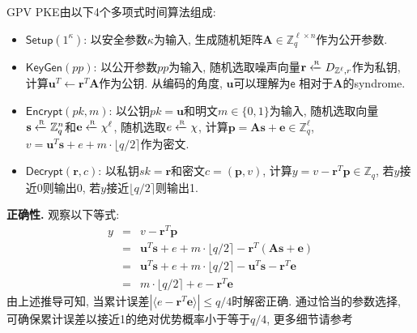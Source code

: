 \begin{trivlist}
\item GPV PKE由以下4个多项式时间算法组成: 
\begin{itemize}
\item $\mathsf{Setup}(1^\kappa)$: 以安全参数$\kappa$为输入, 生成随机矩阵$\mathbf{A} \in \mathbb{Z}_q^{\ell \times n}$作为公开参数. 

\item $\mathsf{KeyGen}(pp)$: 以公开参数$pp$为输入, 随机选取噪声向量$\mathbf{r} \xleftarrow{\textup{\tiny R}} D_{\mathbb{Z}^\ell, r}$作为私钥, 
    计算$\mathbf{u}^T \leftarrow \mathbf{r}^T\mathbf{A}$作为公钥. 从编码的角度, $\mathbf{u}$可以理解为$\mathsf{e}$
    相对于$\mathbf{A}$的syndrome. 

\item $\mathsf{Encrypt}(pk, m)$: 以公钥$pk = \mathbf{u}$和明文$m \in \{0,1\}$为输入, 
	随机选取向量$\mathbf{s} \xleftarrow{\textup{\tiny R}} \mathbb{Z}_q^n$和$\mathbf{e} \xleftarrow{\textup{\tiny R}} \chi^\ell$, 随机选取$e \xleftarrow{\textup{\tiny R}} \chi$, 
	计算$\mathbf{p} = \mathbf{A}\mathbf{s}+\mathbf{e} \in \mathbb{Z}_q^\ell$, 
	$v = \mathbf{u}^T \mathbf{s} + e + m \cdot \lfloor q/2 \rceil$作为密文. 

\item $\mathsf{Decrypt}(\mathbf{r}, c)$: 以私钥$sk = \mathbf{r}$和密文$c = (\mathbf{p}, v)$, 
    计算$y = v - \mathbf{r}^T\mathbf{p} \in \mathbb{Z}_q$, 若$y$接近0则输出0, 
    若$y$接近$\lfloor q/2 \rceil$则输出1.    
\end{itemize}
\end{trivlist}

\begin{trivlist}
\item \textbf{正确性.} 观察以下等式: 
\begin{eqnarray*}
y &=& v - \mathbf{r}^T\mathbf{p}\\
  &=& \mathbf{u}^T \mathbf{s} + e + m \cdot \lfloor q/2 \rceil - \mathbf{r}^T(\mathbf{A}\mathbf{s}+\mathbf{e})\\
  &=& \mathbf{u}^T \mathbf{s} + e + m \cdot \lfloor q/2 \rceil - \mathbf{u}^T\mathbf{s} - \mathbf{r}^T\mathbf{e}\\
  &=& m \cdot \lfloor q/2 \rceil + e - \mathbf{r}^T\mathbf{e}
\end{eqnarray*}
由上述推导可知, 当累计误差$|\langle e - \mathbf{r}^T\mathbf{e} \rangle|\leq q/4$时解密正确. 
通过恰当的参数选择, 可确保累计误差以接近1的绝对优势概率小于等于$q/4$, 更多细节请参考~\cite{GPV-STOC-2008}
\end{trivlist}

